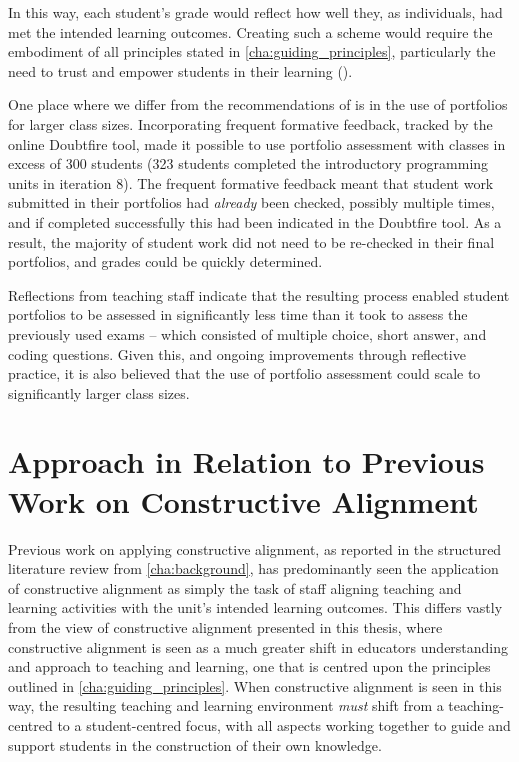 In this way, each student's grade would reflect how well they, as individuals, had met the intended learning outcomes. Creating such a scheme would require the embodiment of all principles stated in \cref{cha:guiding_principles}, particularly the need to trust and empower students in their learning ().

One place where we differ from the recommendations of \citet{Biggs:2007} is in the use of portfolios for larger class sizes. Incorporating frequent formative feedback, tracked by the online Doubtfire tool, made it possible to use portfolio assessment with classes in excess of 300 students (323 students completed the introductory programming units in iteration 8). The frequent formative feedback meant that student work submitted in their portfolios had \emph{already} been checked, possibly multiple times, and if completed successfully this had been indicated in the Doubtfire tool. As a result, the majority of student work did not need to be re-checked in their final portfolios, and grades could be quickly determined. 

Reflections from teaching staff indicate that the resulting process enabled student portfolios to be assessed in significantly less time than it took to assess the previously used exams -- which consisted of multiple choice, short answer, and coding questions. Given this, and ongoing improvements through reflective practice, it is also believed that the use of portfolio assessment could scale to significantly larger class sizes.



\clearpage
\section{Approach in Relation to Previous Work on Constructive Alignment} %
\label{sec:approach_in_relation_to_previous_work}

Previous work on applying constructive alignment, as reported in the structured literature review from \cref{cha:background}, has predominantly seen the application of constructive alignment as simply the task of staff aligning teaching and learning activities with the unit's intended learning outcomes. This differs vastly from the view of constructive alignment presented in this thesis, where constructive alignment is seen as a much greater shift in educators understanding and approach to teaching and learning, one that is centred upon the principles outlined in \cref{cha:guiding_principles}. When constructive alignment is seen in this way, the resulting teaching and learning environment \emph{must} shift from a teaching-centred to a student-centred focus, with all aspects working together to guide and support students in the construction of their own knowledge.

